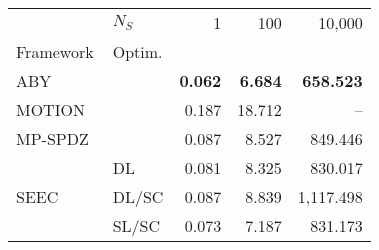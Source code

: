 \begin{tabular}{llrrr}
\toprule
 & $N_S$ & 1 & 100 & 10,000 \\
Framework & Optim. &  &  &  \\
\midrule
ABY~\cite{DSZ15} &  & \bfseries 0.062 & \bfseries 6.684 & \bfseries 658.523 \\
\cline{1-5}
MOTION~\cite{BDST22} &  & 0.187 & 18.712 & -- \\
\cline{1-5}
MP-SPDZ~\cite{CCS:Keller20} &  & 0.087 & 8.527 & 849.446 \\
\cline{1-5}
\multirow[c]{3}{*}{SEEC} & DL & 0.081 & 8.325 & 830.017 \\
 & DL/SC & 0.087 & 8.839 & 1,117.498 \\
 & SL/SC & 0.073 & 7.187 & 831.173 \\
\bottomrule
\end{tabular}
